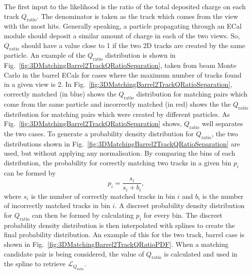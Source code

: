 The first input to the likelihood is the ratio of the total deposited charge on each track $Q_{\textrm{ratio}}$.  The denominator is taken as the track which comes from the view with the most hits.  Generally speaking, a particle propagating through an ECal module should deposit a similar amount of charge in each of the two views.  So, $Q_{\textrm{ratio}}$ should have a value close to 1 if the two 2D tracks are created by the same particle.  An example of the $Q_{\textrm{ratio}}$ distribution is shown in Fig.~\ref{fig:3DMatchingBarrel2TrackQRatioSeparation}, taken from beam Monte Carlo in the barrel ECals for cases where the maximum number of tracks found in a given view is 2.  In Fig.~\ref{fig:3DMatchingBarrel2TrackQRatioSeparation}, correctly matched (in blue) shows the $Q_{\textrm{ratio}}$ distribution for matching pairs which come from the same particle and incorrectly matched (in red) shows the the $Q_{\textrm{ratio}}$ distribution for matching pairs which were created by different particles.  As Fig.~\ref{fig:3DMatchingBarrel2TrackQRatioSeparation} shows, $Q_{\textrm{ratio}}$ well separates the two cases.  To generate a probability density distribution for $Q_{\textrm{ratio}}$, the two distributions shown in Fig.~\ref{fig:3DMatchingBarrel2TrackQRatioSeparation} are used, but without applying any normalisation.  By comparing the bins of each distribution, the probability for correctly matching two tracks in a given bin $p_{i}$ can be formed by
\begin{equation}
  p_i = \frac{s_i}{s_i + b_i}
  \label{eq:BinProbabilityPDF},
\end{equation}
where $s_i$ is the number of correctly matched tracks in bin $i$ and $b_i$ is the number of incorrectly matched tracks in bin $i$.  A discreet probability density distribution for $Q_{\textrm{ratio}}$ can then be formed by calculating $p_i$ for every bin.  The discreet probability density distribution is then interpolated with splines to create the final probability distribution.  An example of this for the two track, barrel case is shown in Fig.~\ref{fig:3DMatchingBarrel2TrackQRatioPDF}.  When a matching candidate pair is being considered, the value of $Q_{\textrm{ratio}}$ is calculated and used in the spline to retrieve $\mathcal{L}_{Q_{\textrm{ratio}}}$.

